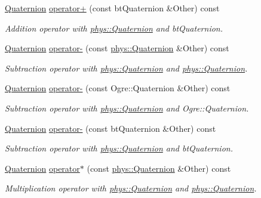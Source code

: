 \begin{DoxyCompactItemize}
\hyperlink{classphys_1_1Quaternion}{Quaternion} \hyperlink{classphys_1_1Quaternion_a3dc35eeb41c43ce79fdf2fc64fc15532}{operator+} (const btQuaternion \&Other) const 
\begin{DoxyCompactList}\small\item\em Addition operator with \hyperlink{classphys_1_1Quaternion}{phys::Quaternion} and btQuaternion. \item\end{DoxyCompactList}\item 
\hyperlink{classphys_1_1Quaternion}{Quaternion} \hyperlink{classphys_1_1Quaternion_abab2d787eefc90bbc6710091a5a79234}{operator-\/} (const \hyperlink{classphys_1_1Quaternion}{phys::Quaternion} \&Other) const 
\begin{DoxyCompactList}\small\item\em Subtraction operator with \hyperlink{classphys_1_1Quaternion}{phys::Quaternion} and \hyperlink{classphys_1_1Quaternion}{phys::Quaternion}. \item\end{DoxyCompactList}\item 
\hyperlink{classphys_1_1Quaternion}{Quaternion} \hyperlink{classphys_1_1Quaternion_a01c5412ce8f1ebb212c9afd7e19feb1e}{operator-\/} (const Ogre::Quaternion \&Other) const 
\begin{DoxyCompactList}\small\item\em Subtraction operator with \hyperlink{classphys_1_1Quaternion}{phys::Quaternion} and Ogre::Quaternion. \item\end{DoxyCompactList}\item 
\hyperlink{classphys_1_1Quaternion}{Quaternion} \hyperlink{classphys_1_1Quaternion_aca49f84681f836545c30c0b42480dccc}{operator-\/} (const btQuaternion \&Other) const 
\begin{DoxyCompactList}\small\item\em Subtraction operator with \hyperlink{classphys_1_1Quaternion}{phys::Quaternion} and btQuaternion. \item\end{DoxyCompactList}\item 
\hyperlink{classphys_1_1Quaternion}{Quaternion} \hyperlink{classphys_1_1Quaternion_a2b1017fc916a896440a00bee3fd3ca9b}{operator$\ast$} (const \hyperlink{classphys_1_1Quaternion}{phys::Quaternion} \&Other) const 
\begin{DoxyCompactList}\small\item\em Multiplication operator with \hyperlink{classphys_1_1Quaternion}{phys::Quaternion} and \hyperlink{classphys_1_1Quaternion}{phys::Quaternion}. \item\end{DoxyCompactList}\item 

\end{DoxyCompactItemize}
